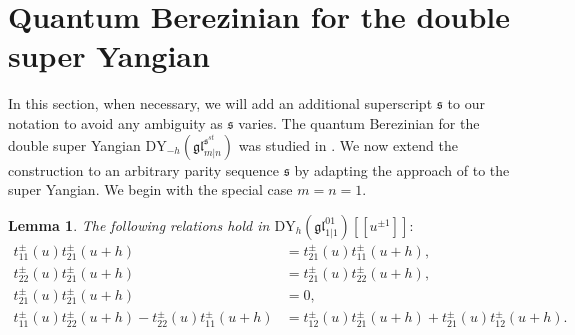 \documentclass[a4paper,12pt]{article}
\newtheorem{lemm}[theo]{Lemma}
\numberwithin{equation}{section}
\begin{document}
\section{Quantum Berezinian for the double super Yangian}

In this section, when necessary, we will add an additional superscript $\mathfrak{s}$ to our notation to avoid any ambiguity as $\mathfrak{s}$ varies. 
The quantum Berezinian for the double super Yangian  $\mathrm{DY}_{-h}(\mathfrak{gl}_{m|n}^{\mathfrak{s}^{st}})$ was studied in \cite{BK25-1}. We now extend the construction to an arbitrary parity sequence $\mathfrak{s}$ by adapting the approach of \cite{CH23} to the super Yangian. We begin with the special case $m=n=1$.

\begin{lemm}
The following relations hold in $\mathrm{DY}_{h}(\mathfrak{gl}_{1|1}^{01})[[u^{\pm 1}]]:$
\begin{align}\label{e1}
t_{11}^{\pm}(u)t_{21}^{\pm}(u+h)&=t_{21}^{\pm}(u)t_{11}^{\pm}(u+h),\\ \label{e2}
t_{22}^{\pm}(u)t_{21}^{\pm}(u+h)&=t_{21}^{\pm}(u)t_{22}^{\pm}(u+h),\\ \label{e3}
t_{21}^{\pm}(u)t_{21}^{\pm}(u+h)&=0,\\ \label{e4}
t_{11}^{\pm}(u)t_{22}^{\pm}(u+h)-t_{22}^{\pm}(u)t_{11}^{\pm}(u+h)&=t_{12}^{\pm}(u)
t_{21}^{\pm}(u+h)+t_{21}^{\pm}(u)t_{12}^{\pm}(u+h).
\end{align}
\end{lemm}
\end{document}
